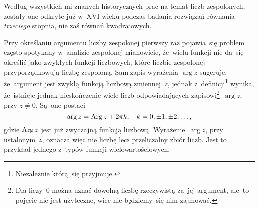 \documentclass[a4paper,11pt]{article}
\begin{document}
\vspace{\spaceFour}



\start {} Według wszystkich mi znanych historycznych prac na
temat liczb zespolonych, zostały one odkryte już w~XVI wieku podczas
badania rozwiązań równania \textit{trzeciego} stopnia, nie zaś równań
kwadratowych. 

\vspace{\spaceFour}



\start {} Przy określaniu argumentu liczby zespolonej pierwszy
raz pojawia~się problem często spotykany w~analizie zespolonej
mianowicie, że~wielu funkcji nie da~się określić jako zwykłych funkcji
liczbowych, które liczbie zespolonej przyporządkowują liczbę
zespoloną. Sam zapis wyrażenia $\arg z$ sugeruje, że~argument jest
zwykłą funkcją liczbową zmiennej~$z$, jednak
z~definicji\footnote{Niezależnie którą~się przyjmuje.} wynika,
że~istnieje jednak nieskończenie wiele liczb odpowiadających
zapisowi\footnote{Dla liczy~$0$ można uznać
  dowolną liczbę rzeczywistą za~jej argument, ale~to pojęcie nie jest
  użyteczne, więc nie będziemy~się nim zajmować.}~$\arg z$, przy $z \neq 0$. Są~one postaci
\begin{equation}
  \label{eq:Leja-07}
  \arg z = \operatorname{Arg} z + 2\pi k, \quad k = 0, \pm 1, \pm 2, \ldots,
\end{equation}
gdzie $\operatorname{Arg} z$ jest już zwyczajną funkcją liczbową.
Wyrażenie~$\arg z$, przy ustalonym~$z$, oznacza więc nie liczbę lecz
przeliczalny zbiór liczb. Jest to przykład jednego z~typów funkcji
wielowartościowych.


\end{document}
